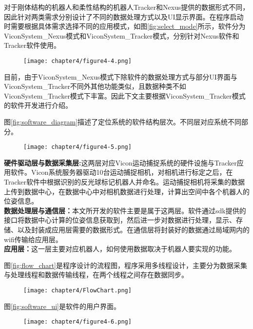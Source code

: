 对于刚体结构的机器人和柔性结构的机器人Tracker和Nexus提供的数据形式不同，因此针对两类需求分别设计了不同的数据处理方式以及UI显示界面。在程序启动时需要根据具体需求选择不同的应用模式，如图\ref{fig:select_mode}所示，软件分为ViconSystem\_Nexus模式和ViconSystem\_Tracker模式，分别针对Nexus软件和Tracker软件使用。
\begin{figure}[!htbp]
	\centering
	\texttt{[image: chapter4/figure4-4.png]}
\end{figure}

目前，由于ViconSystem\_Nexus模式下除软件的数据处理方式与部分UI界面与ViconSystem\_Tracker不同外其他功能类似，且数据种类不如ViconSystem\_Tracker模式下丰富。因此下文主要根据ViconSystem\_Tracker模式的软件开发进行介绍。

图\ref{fig:software_diagram}描述了定位系统的软件结构层次。不同层对应系统不同部分。
\begin{figure}[!htbp]
	\centering
	\texttt{[image: chapter4/figure4-5.png]}
\end{figure}

\indent \textbf{硬件驱动层与数据采集层:}这两层对应Vicon运动捕捉系统的硬件设施与Tracker应用软件。Vicon系统服务器驱动10台运动捕捉相机，对相机进行标定之后，在Tracker软件中根据识别的反光球标记机器人并命名。运动捕捉相机将采集的数据上传到数据中心，在数据中心中对相机数据进行处理，计算出空间中各个机器人的位姿信息。\\
\indent \textbf{数据处理层与通信层：}本文所开发的软件主要是属于这两层。软件通过sdk提供的接口将数据中心计算的位姿信息获取到，然后进一步对数据进行处理，显示、存储、以及封装成应用层需要的数据形式。在通信层将封装好的数据通过局域网内的wifi传输给应用层。\\
\indent \textbf{应用层：}这一层主要对应机器人，如何使用数据取决于机器人要实现的功能。

图\ref{fig:flow_chart}是程序设计的流程图，程序采用多线程设计，主要分为数据采集与处理线程和数据传输线程，在两个线程之间存在数据同步。
\begin{figure}[!htbp]
	\centering
	\texttt{[image: chapter4/FlowChart.png]}
\end{figure}

图\ref{fig:software_ui}是软件的用户界面。
\begin{figure}[!htbp]
	\centering
	\texttt{[image: chapter4/figure4-6.png]}
\end{figure}

